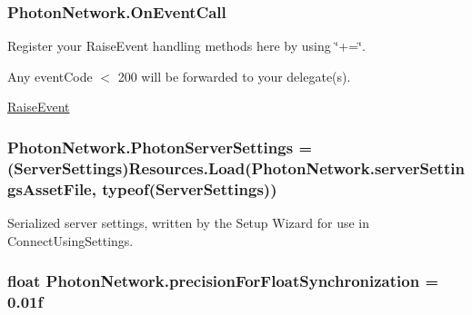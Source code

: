 \subsubsection[{\texorpdfstring{On\+Event\+Call}{OnEventCall}}]{ Photon\+Network.\+On\+Event\+Call\hspace{0.3cm}{\ttfamily [static]}}\hypertarget{class_photon_network_a81af9e901341d6b647df1f6d7f2d7583}{}\label{class_photon_network_a81af9e901341d6b647df1f6d7f2d7583}


Register your Raise\+Event handling methods here by using \char`\"{}+=\char`\"{}. 

Any event\+Code $<$ 200 will be forwarded to your delegate(s).

\hyperlink{class_photon_network_aa9088b089a8c1b3548f8a7a792146e50}{Raise\+Event} 
\subsubsection[{\texorpdfstring{Photon\+Server\+Settings}{PhotonServerSettings}}]{ Photon\+Network.\+Photon\+Server\+Settings = ({\bf Server\+Settings})Resources.\+Load(Photon\+Network.\+server\+Settings\+Asset\+File, typeof({\bf Server\+Settings}))\hspace{0.3cm}{\ttfamily [static]}}\hypertarget{class_photon_network_a505f06c3eb4ca67db5dd517aab34143d}{}\label{class_photon_network_a505f06c3eb4ca67db5dd517aab34143d}


Serialized server settings, written by the Setup Wizard for use in Connect\+Using\+Settings.

\subsubsection[{\texorpdfstring{precision\+For\+Float\+Synchronization}{precisionForFloatSynchronization}}]{\setlength{\rightskip}{0pt plus 5cm}float Photon\+Network.\+precision\+For\+Float\+Synchronization = 0.\+01f\hspace{0.3cm}{\ttfamily [static]}}\hypertarget{class_photon_network_a734d436869fa53cb8660de63e79e6252}{}\label{class_photon_network_a734d436869fa53cb8660de63e79e6252}


